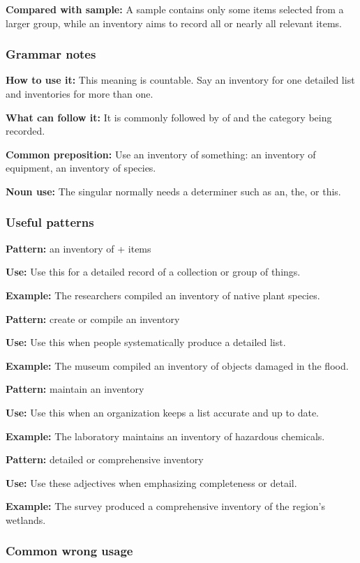 \documentclass[11pt]{article}
\begin{document}
\textbf{Compared with sample:} A sample contains only some items selected from a larger group, while an inventory aims to record all or nearly all relevant items.

\subsubsection{Grammar notes}
\textbf{How to use it:} This meaning is countable. Say an inventory for one detailed list and inventories for more than one.

\textbf{What can follow it:} It is commonly followed by of and the category being recorded.

\textbf{Common preposition:} Use an inventory of something: an inventory of equipment, an inventory of species.

\textbf{Noun use:} The singular normally needs a determiner such as an, the, or this.

\subsubsection{Useful patterns}
\textbf{Pattern:} an inventory of + items

\textbf{Use:} Use this for a detailed record of a collection or group of things.

\textbf{Example:} The researchers compiled an inventory of native plant species.

\textbf{Pattern:} create or compile an inventory

\textbf{Use:} Use this when people systematically produce a detailed list.

\textbf{Example:} The museum compiled an inventory of objects damaged in the flood.

\textbf{Pattern:} maintain an inventory

\textbf{Use:} Use this when an organization keeps a list accurate and up to date.

\textbf{Example:} The laboratory maintains an inventory of hazardous chemicals.

\textbf{Pattern:} detailed or comprehensive inventory

\textbf{Use:} Use these adjectives when emphasizing completeness or detail.

\textbf{Example:} The survey produced a comprehensive inventory of the region's wetlands.

\subsubsection{Common wrong usage}
\end{document}
